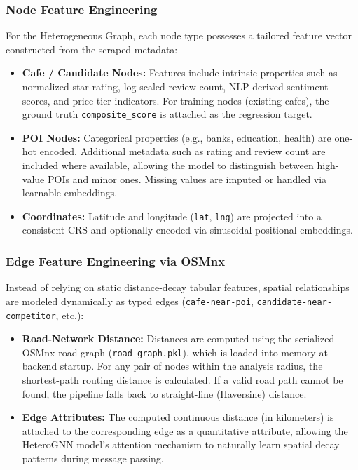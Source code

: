 \subsubsection{Node Feature Engineering}
For the Heterogeneous Graph, each node type possesses a tailored feature vector constructed from the scraped metadata:
\begin{itemize}
    \item \textbf{Cafe / Candidate Nodes:} Features include intrinsic properties such as normalized star rating, log-scaled review count, NLP-derived sentiment scores, and price tier indicators. For training nodes (existing cafes), the ground truth \texttt{composite\_score} is attached as the regression target.
    \item \textbf{POI Nodes:} Categorical properties (e.g., banks, education, health) are one-hot encoded. Additional metadata such as rating and review count are included where available, allowing the model to distinguish between high-value POIs and minor ones. Missing values are imputed or handled via learnable embeddings.
    \item \textbf{Coordinates:} Latitude and longitude (\texttt{lat}, \texttt{lng}) are projected into a consistent CRS and optionally encoded via sinusoidal positional embeddings.
\end{itemize}

\subsubsection{Edge Feature Engineering via OSMnx}
Instead of relying on static distance-decay tabular features, spatial relationships are modeled dynamically as typed edges (\texttt{cafe-near-poi}, \texttt{candidate-near-competitor}, etc.):
\begin{itemize}
    \item \textbf{Road-Network Distance:} Distances are computed using the serialized OSMnx road graph (\texttt{road\_graph.pkl}), which is loaded into memory at backend startup. For any pair of nodes within the analysis radius, the shortest-path routing distance is calculated. If a valid road path cannot be found, the pipeline falls back to straight-line (Haversine) distance.
    \item \textbf{Edge Attributes:} The computed continuous distance (in kilometers) is attached to the corresponding edge as a quantitative attribute, allowing the HeteroGNN model's attention mechanism to naturally learn spatial decay patterns during message passing.
\end{itemize}

